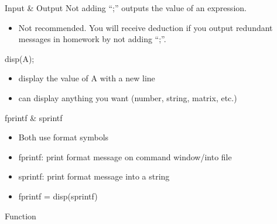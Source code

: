 \begin{frame}{Input \& Output}
Not adding ``;'' outputs the value of an expression.
\begin{itemize}
\item Not recommended. You will receive deduction if you output redundant messages in homework by not adding ``;''.
\end{itemize}
disp(A);
\begin{itemize}
\item display the value of A with a new line
\item can display anything you want (number, string, matrix, etc.)
\end{itemize}
fprintf \& sprintf
\begin{itemize}
\item Both use format symbols
\item fprintf: print format message on command window/into file
\item sprintf: print format message into a string
\item fprintf = disp(sprintf)
\end{itemize}
\end{frame}

\begin{frame}{Function}

\end{frame}
